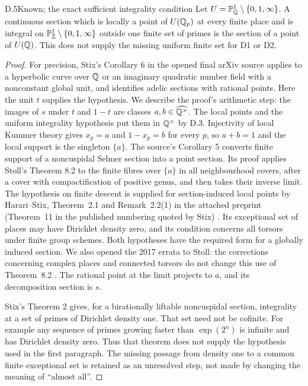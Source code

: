 \begin{claim}{D.5}{Known; the exact sufficient integrality condition}
Let $U=\mathbb P^1_\mathbb Q\setminus\{0,1,\infty\}$. A continuous section
which is locally a point of $U(\mathbb Q_p)$ at every finite place and is
integral on $\mathbb P^1_\mathbb Z\setminus\{0,1,\infty\}$ outside one
finite set of primes is the section of a point of $U(\mathbb Q)$.
This does not supply the missing uniform finite set for D1 or D2.
\end{claim}
\begin{proof}
For precision, Stix's Corollary 6 in the opened final arXiv source
\citep{D_Stix2015} applies to a hyperbolic curve over $\mathbb Q$ or an
imaginary quadratic number field with a nonconstant global unit,
and identifies adelic sections with rational points. Here the unit
$t$ supplies the hypothesis. We describe the proof's arithmetic
step: the images of $s$ under $t$ and $1-t$ are classes
$a,b\in\widehat{\mathbb Q^\times}$. The local points and the uniform
integrality hypothesis put them in $\mathbb Q^\times$ by D.3. Injectivity
of local Kummer theory gives $x_p=a$ and $1-x_p=b$ for every $p$,
so $a+b=1$ and the local support is the singleton $\{a\}$.
The source's Corollary 5 converts finite support of a noncuspidal
Selmer section into a point section. Its proof applies Stoll's
Theorem 8.2 to the finite fibres over $\{a\}$ in all neighbourhood
covers, after a cover with compactification of positive genus,
and then takes their inverse limit. The hypothesis on finite
descent is supplied for section-induced local points by
Harari--Stix, Theorem~2.1 and Remark~2.2(1) in the attached
preprint (Theorem~11 in the published numbering quoted by Stix)
\citep{D_HarariStix2012,D_Stoll2007}. Its exceptional set of
places may have Dirichlet density zero, and its condition concerns
all torsors under finite group schemes. Both hypotheses have the
required form for a globally induced section. We also opened the
2017 errata to Stoll: the corrections concerning complex places
and connected torsors do not change this use of Theorem~8.2
\citep{D_StollErrata2017}.
The rational point at the limit projects to $a$, and its
decomposition section is $s$.

Stix's Theorem 2 gives, for a birationally liftable noncuspidal
section, integrality at a set of primes of Dirichlet density one.
That set need not be cofinite. For example any sequence of primes
growing faster than $\exp(2^n)$ is infinite and has Dirichlet
density zero. Thus that theorem does not supply the hypothesis
used in the first paragraph. The missing passage from density
one to a common finite exceptional set is retained as an
unresolved step, not made by changing the meaning of ``almost all''.
\end{proof}


